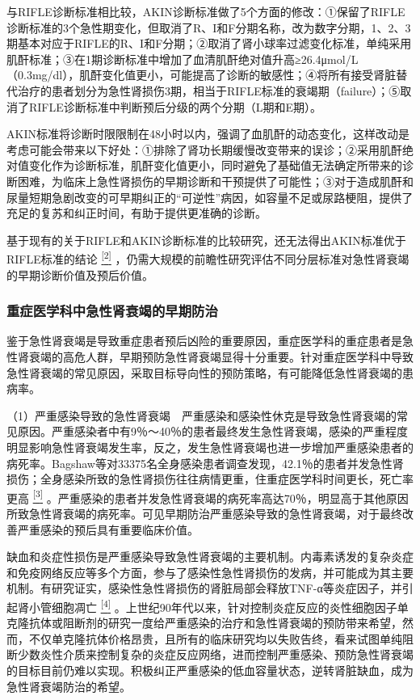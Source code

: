 与RIFLE诊断标准相比较，AKIN诊断标准做了5个方面的修改：①保留了RIFLE诊断标准的3个急性期变化，但取消了R、I和F分期名称，改为数字分期，1、2、3期基本对应于RIFLE的R、I和F分期；②取消了肾小球率过滤变化标准，单纯采用肌酐标准；③在1期诊断标准中增加了血清肌酐绝对值升高≥26.4μmol/L（0.3mg/dl），肌酐变化值更小，可能提高了诊断的敏感性；④将所有接受肾脏替代治疗的患者划分为急性肾损伤3期，相当于RIFLE标准的衰竭期（failure）；⑤取消了RIFLE诊断标准中判断预后分级的两个分期（L期和E期）。

AKIN标准将诊断时限限制在48小时以内，强调了血肌酐的动态变化，这样改动是考虑可能会带来以下好处：①排除了肾功长期缓慢改变带来的误诊；②采用肌酐绝对值变化作为诊断标准，肌酐变化值更小，同时避免了基础值无法确定所带来的诊断困难，为临床上急性肾损伤的早期诊断和干预提供了可能性；③对于造成肌酐和尿量短期急剧改变的可早期纠正的“可逆性”病因，如容量不足或尿路梗阻，提供了充足的复苏和纠正时间，有助于提供更准确的诊断。

基于现有的关于RIFLE和AKIN诊断标准的比较研究，还无法得出AKIN标准优于RIFLE标准的结论
\protect\hyperlink{text00017.htmlux5cux23ch2-16}{\textsuperscript{{[}2{]}}}
，仍需大规模的前瞻性研究评估不同分层标准对急性肾衰竭的早期诊断价值及预后价值。

\subsubsection{重症医学科中急性肾衰竭的早期防治}

鉴于急性肾衰竭是导致重症患者预后凶险的重要原因，重症医学科的重症患者是急性肾衰竭的高危人群，早期预防急性肾衰竭显得十分重要。针对重症医学科中导致急性肾衰竭的常见原因，采取目标导向性的预防策略，有可能降低急性肾衰竭的患病率。

（1）严重感染导致的急性肾衰竭　严重感染和感染性休克是导致急性肾衰竭的常见原因。严重感染者中有9％～40％的患者最终发生急性肾衰竭，感染的严重程度明显影响急性肾衰竭发生率，反之，发生急性肾衰竭也进一步增加严重感染患者的病死率。Bagshaw等对33375名全身感染患者调查发现，42.1％的患者并发急性肾损伤；全身感染所致的急性肾损伤往往病情更重，住重症医学科时间更长，死亡率更高
\protect\hyperlink{text00017.htmlux5cux23ch3-16}{\textsuperscript{{[}3{]}}}
。严重感染的患者并发急性肾衰竭的病死率高达70％，明显高于其他原因所致急性肾衰竭的病死率。可见早期防治严重感染导致的急性肾衰竭，对于最终改善严重感染的预后具有重要临床价值。

缺血和炎症性损伤是严重感染导致急性肾衰竭的主要机制。内毒素诱发的复杂炎症和免疫网络反应等多个方面，参与了感染性急性肾损伤的发病，并可能成为其主要机制。有研究证实，感染性急性肾损伤的肾脏局部会释放TNF-α等炎症因子，并引起肾小管细胞凋亡
\protect\hyperlink{text00017.htmlux5cux23ch4-16}{\textsuperscript{{[}4{]}}}
。上世纪90年代以来，针对控制炎症反应的炎性细胞因子单克隆抗体或阻断剂的研究一度给严重感染的治疗和急性肾衰竭的预防带来希望，然而，不仅单克隆抗体价格昂贵，且所有的临床研究均以失败告终，看来试图单纯阻断少数炎性介质来控制复杂的炎症反应网络，进而控制严重感染、预防急性肾衰竭的目标目前仍难以实现。积极纠正严重感染的低血容量状态，逆转肾脏缺血，成为急性肾衰竭防治的希望。

